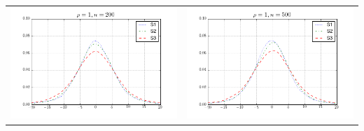 \begin{table}[!ht]
{\begin{tabular}{c c}
\includegraphics[width=8cm]{alpha_scaled_density_200_1} & \includegraphics[width=8cm]{alpha_scaled_density_500_1} \\
\end{tabular}
}
\end{table}



